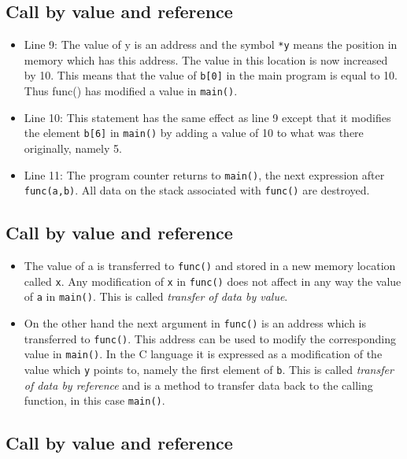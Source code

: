 \documentclass[%
oneside,                 %
final,                   %
10pt]{article}
\begin{document}
{{{{{\noindent
\subsection{Call by value and reference}

\begin{itemize}
  \item Line 9: The value of y is an address and the symbol \Verb!*y! means the position in memory which has this address. The value in this location is now increased by 10. This means that the value of \Verb!b[0]! in the main program is equal to 10. Thus func() has modified a value in \Verb!main()!.

  \item Line 10: This statement has the same effect as line 9 except that it modifies the element \Verb!b[6]! in \Verb!main()! by adding a value of 10 to what was there originally, namely 5.

  \item Line 11: The program counter returns to \Verb!main()!, the next expression after \Verb!func(a,b)!. All data on the stack associated with \Verb!func()! are destroyed.
\end{itemize}

\noindent
\subsection{Call by value and reference}

\begin{itemize}
  \item The value of a is transferred to \Verb!func()! and stored in a new memory location called \Verb!x!. Any modification of \Verb!x! in \Verb!func()! does not affect in any way the value of \Verb!a! in \Verb!main()!. This is called \emph{transfer of data by value}.

  \item On the other hand the next argument in \Verb!func()! is an address which is transferred to \Verb!func()!. This address can be used to modify the corresponding value in \Verb!main()!. In the C language it is expressed as a modification of the value which \Verb!y! points to, namely the first element of \Verb!b!. This is called \emph{transfer of data by reference} and is a method to transfer data back to the calling function, in this case \Verb!main()!.
\end{itemize}

\noindent
\subsection{Call by value and reference}

}}}}}
\end{document}
